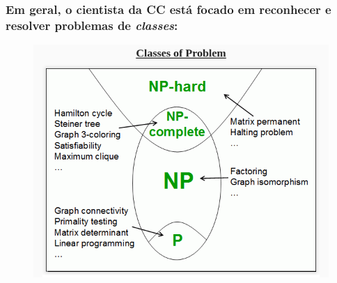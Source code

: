 \documentclass[10pt]{beamer}
\begin{document}
\begin{frame}[fragile]
\frametitle{Em geral, o cientista da CC está focado em reconhecer e resolver problemas de \emph{classes}:}
\begin{figure}[!ht]
	\centering
	\includegraphics[height =.7\textheight,width=.8\textwidth]
	{figuras/classes_de_problemas.png}
\end{figure}

\end{frame}
\end{document}
